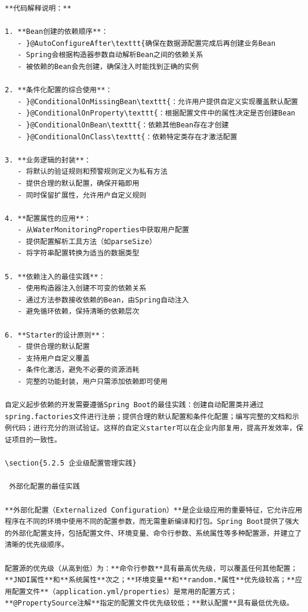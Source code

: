\begin{lstlisting}
**代码解释说明：**

1. **Bean创建的依赖顺序**：
   - }@AutoConfigureAfter\texttt{确保在数据源配置完成后再创建业务Bean
   - Spring会根据构造器参数自动解析Bean之间的依赖关系
   - 被依赖的Bean会先创建，确保注入时能找到正确的实例

2. **条件化配置的综合使用**：
   - }@ConditionalOnMissingBean\texttt{：允许用户提供自定义实现覆盖默认配置
   - }@ConditionalOnProperty\texttt{：根据配置文件中的属性决定是否创建Bean
   - }@ConditionalOnBean\texttt{：依赖其他Bean存在才创建
   - }@ConditionalOnClass\texttt{：依赖特定类存在才激活配置

3. **业务逻辑的封装**：
   - 将默认的验证规则和预警规则定义为私有方法
   - 提供合理的默认配置，确保开箱即用
   - 同时保留扩展性，允许用户自定义规则

4. **配置属性的应用**：
   - 从WaterMonitoringProperties中获取用户配置
   - 提供配置解析工具方法（如parseSize）
   - 将字符串配置转换为适当的数据类型

5. **依赖注入的最佳实践**：
   - 使用构造器注入创建不可变的依赖关系
   - 通过方法参数接收依赖的Bean，由Spring自动注入
   - 避免循环依赖，保持清晰的依赖层次

6. **Starter的设计原则**：
   - 提供合理的默认配置
   - 支持用户自定义覆盖
   - 条件化激活，避免不必要的资源消耗
   - 完整的功能封装，用户只需添加依赖即可使用

自定义起步依赖的开发需要遵循Spring Boot的最佳实践：创建自动配置类并通过spring.factories文件进行注册；提供合理的默认配置和条件化配置；编写完整的文档和示例代码；进行充分的测试验证。这样的自定义starter可以在企业内部复用，提高开发效率，保证项目的一致性。

\section{5.2.5 企业级配置管理实践}

 外部化配置的最佳实践

**外部化配置（Externalized Configuration）**是企业级应用的重要特征，它允许应用程序在不同的环境中使用不同的配置参数，而无需重新编译和打包。Spring Boot提供了强大的外部化配置支持，包括配置文件、环境变量、命令行参数、系统属性等多种配置源，并建立了清晰的优先级顺序。

配置源的优先级（从高到低）为：**命令行参数**具有最高优先级，可以覆盖任何其他配置；**JNDI属性**和**系统属性**次之；**环境变量**和**random.*属性**优先级较高；**应用配置文件**（application.yml/properties）是常用的配置方式；**@PropertySource注解**指定的配置文件优先级较低；**默认配置**具有最低优先级。
\end{lstlisting}

